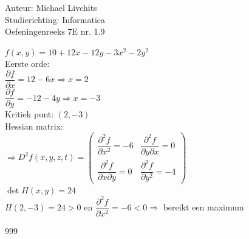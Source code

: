 \documentclass[a4paper]{article}
\begin{document}
  
\noindent \large Auteur: Michael Livchits \\
\noindent \large Studierichting: Informatica\\
\noindent \large Oefeningenreeks 7E nr. 1.9\\

\medskip

\normalsize

$f(x,y)= 10+12x-12y-3x^2-2y^2$\\
	
Eerste orde:\\
	
$\dfrac{\partial f}{\partial x} = 12-6x \Rightarrow x = 2$\\
	
$\dfrac{\partial f}{\partial y} = -12-4y \Rightarrow x = -3$\\

Kritiek punt: $(2,-3)$\\

Hessian matrix:\\

$\Rightarrow D^2f(x,y,z,t) = \left(\begin{array}{cc}
\dfrac{\partial^2 f}{\partial x^2} = -6 & \dfrac{\partial^2 f}{\partial y\partial x} = 0\\
\dfrac{\partial^2 f}{\partial x\partial y} = 0 & \dfrac{\partial^2 f}{\partial y^2} = -4
\end{array}\right)$\\

$\det H(x,y) = 24$\\

$H(2,-3) = 24 > 0$ en $\dfrac{\partial^2 f}{\partial x^2} = -6 < 0\Rightarrow$ bereikt een maximum\\

\begin{thebibliography}{999}
\end{thebibliography}
\end{document}

